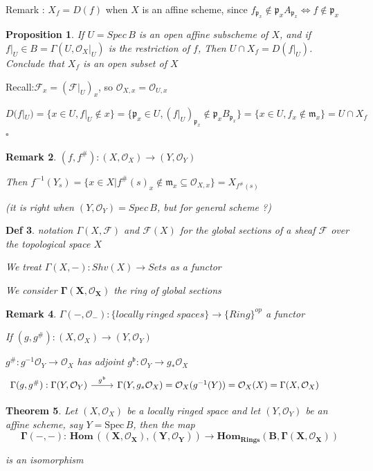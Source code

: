 \documentclass{article}
\newtheorem{theorem}{Theorem}[section]
\newtheorem{definition}[theorem]{Def}
\newtheorem{proposition}[theorem]{Proposition}
\newtheorem{remark}[theorem]{Remark}
\newenvironment{Proof}{{\noindent \indent \it Proof:\quad}}{\hfill $\square$\par}
\begin{document}
Remark : $X_f=D(f)$ when $X$ is an affine scheme, since $f_{\mathfrak p_x} \notin \mathfrak p_xA_{\mathfrak p_x}
\Leftrightarrow 
f\notin \mathfrak p_x$ 

\begin{proposition}
    If $U = Spec\, B$ is an open affine subscheme of $X$, and if $f|_U \in B = \Gamma (U,\mathcal O_X|_U)$ is 
the restriction of $f$, Then $U \cap X_f = D(f|_U)$. Conclude that $X_f$ is an open 
subset of $X$
\end{proposition}
\begin{Proof}
Recall:$\mathcal F_x=(\mathcal F|_U)_x$, so $\mathcal O_{X,x}=\mathcal O_{U,x}$

    $D(f|_U)=
    \{
    x\in U,f|_U\notin x
    \}
    =
    \{
    \mathfrak p_x\in U,(f|_U)_{\mathfrak p_x} \notin \mathfrak p_x B_{\mathfrak p_x}
    \}
    =
    \{
    x\in U,f_{x} \notin \mathfrak m_x
    \}
    =
    U \cap X_f
    $
\end{Proof}

\begin{remark}
$(f,f^{\#}):(X,\mathcal O_X)\to(Y,\mathcal O_Y)$

Then
$f^{-1}(Y_s) = \{x \in X | f^{\#}(s)_x \notin\mathfrak m_x \subseteq \mathcal O_{X,x} \} = X_{f^{\#}(s)}$

(it is right when $(Y,\mathcal O_Y)=Spec\,B$, but for general scheme ?)
\end{remark}


\begin{definition}
    notation $\Gamma(X,\mathcal F)$ and $\mathcal F(X)$ for the global sections of a sheaf $\mathcal F$ over the topological space $X$

    We treat $\Gamma(X,-):Shv(X)\to Sets$ as a functor

    We consider $\bm{\Gamma(X,\mathcal O_X)}$ the ring of global sections
\end{definition}
\begin{remark}
   $\Gamma(-,\mathcal O_-):\{locally\;ringed\;spaces\}
    \to
    \{Ring\}^{op}$ a functor

    If $(g,g^{\#}):(X,\mathcal O_X)\to(Y,\mathcal O_Y)$

    $g^{\#}:g^{-1}\mathcal O_Y\to\mathcal O_X$ has adjoint $g^{\mathfrak b}:\mathcal O_Y\to g_{\ast}\mathcal O_X$
\[\begin{tikzcd}
	{\Gamma(g,g^{\#}):\Gamma(Y,\mathcal O_Y)} & {\Gamma(Y,g_{\ast}\mathcal O_X)=\mathcal O_X(g^{-1}(Y))=\mathcal O_X(X)=\Gamma(X,\mathcal O_X)} & {}
	\arrow["{g^{\mathfrak b}}", from=1-1, to=1-2]
\end{tikzcd}\]
\end{remark}
\begin{theorem}
    Let $(X,{\mathcal{O}}_{X})$ be a locally ringed space and let $(Y,{\mathcal{O}}_{Y})$ be an affine scheme, say ${Y}= \mathrm{ Spec}\, B$, then the map
$$
\bm{\Gamma(-,-):\,
Hom\,((X,{\mathcal{O}}_{X}),(Y,{\mathcal{O}}_{Y}))\longrightarrow 
Hom_{Rings}(B,\Gamma(X,{\mathcal{O}}_{X}))}
$$

is an  isomorphism
\end{theorem}
\end{document}
